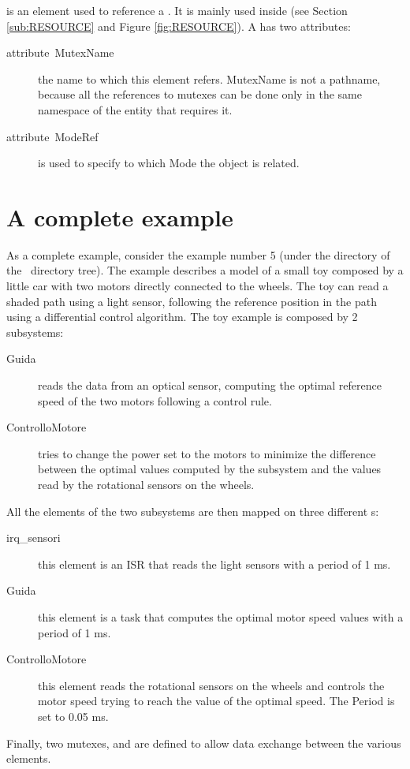  is an element used to reference a .  It
is mainly used inside  (see Section
\ref{sub:RESOURCE} and Figure \ref{fig:RESOURCE}). A 
has two attributes:
\begin{description}
\item [{attribute~MutexName}] the  name to which this
  element refers. MutexName is not a pathname, because all the
  references to mutexes can be done only in the same namespace of the
  entity that requires it.
\item [{attribute~ModeRef}] is used to specify to which Mode the
   object is related.
\end{description}

\section{A complete example}

As a complete example, consider the example number 5 (under the
directory  of the \rtd\ directory tree). The
example describes a model of a small toy composed by a little car with
two motors directly connected to the wheels. The toy can read a shaded
path using a light sensor, following the reference position in the
path using a differential control algorithm. The toy example is
composed by 2 subsystems:

\begin{description}
\item [Guida] reads the data from an optical sensor, computing the
  optimal reference speed of the two motors following a control rule.
\item [ControlloMotore] tries to change the power set to the motors to
  minimize the difference between the optimal values computed by the
   subsystem and the values read by the rotational
  sensors on the wheels.
\end{description}

All the  elements of the two subsystems are then mapped on
three different s:

\begin{description}
\item [irq\_sensori] this  element is an ISR
  that reads the light sensors with a period of 1 ms.
\item [Guida] this  element is a task that
  computes the optimal motor speed values with a period of 1 ms.
\item [ControlloMotore] this  element reads the
  rotational sensors on the wheels and controls the motor speed trying
  to reach the value of the optimal speed. The Period is set to 0.05
  ms.
\end{description}

Finally, two mutexes,  and  are
defined to allow data exchange between the various 
elements.
